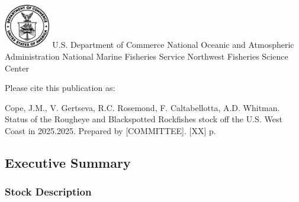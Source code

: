 \documentclass[
]{scrartcl}
\renewcommand*\contentsname{Table of contents}
\newcommand\contentsname{Table of contents}
\begin{document}
\begin{titlepage}
\begin{minipage}[b][\textheight][s]{\textwidth}
  \vspace{1\baselineskip}



  \vfill


  \vspace{1\baselineskip}

  \includegraphics[alt={},width=2cm]{support_files/us_doc_logo.png}\newline %
  U.S. Department of Commerce\newline
  National Oceanic and Atmospheric Administration\newline
  National Marine Fisheries Service\newline
  Northwest Fisheries Science Center\newline

  \end{minipage}
  \restoregeometry
  \end{titlepage}

\renewcommand*\contentsname{Table of contents}
{
\hypersetup{linkcolor=}
\setcounter{tocdepth}{3}
\tableofcontents
}
\listoffigures
\listoftables

\newpage{}

Please cite this publication as:

Cope, J.M., V. Gertseva, R.C. Rosemond, F. Caltabellotta, A.D. Whitman.
Status of the Rougheye and Blackspotted Rockfishes stock off the U.S.
West Coast in 2025.2025. Prepared by {[}COMMITTEE{]}. {[}XX{]} p.

\newpage{}

\subsection{Executive Summary}\label{executive-summary}

\subsubsection{Stock Description}\label{stock-description}
\end{document}
